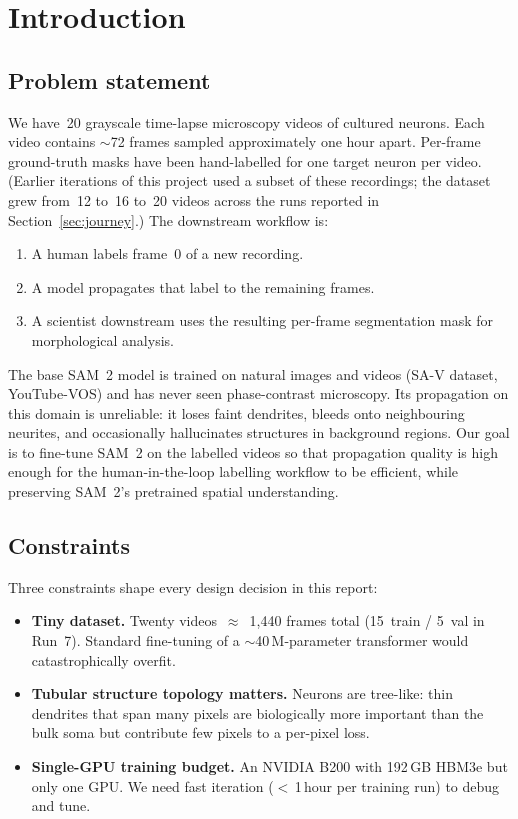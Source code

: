 \documentclass[11pt,a4paper]{article}
\begin{document}
\section{Introduction}

\subsection{Problem statement}

We have~20 grayscale time-lapse microscopy videos of cultured neurons.
Each video contains $\sim$72 frames sampled approximately one hour
apart. Per-frame ground-truth masks have been hand-labelled for one
target neuron per video. (Earlier iterations of this project used
a subset of these recordings; the dataset grew from~12 to~16 to~20
videos across the runs reported in Section~\ref{sec:journey}.) The downstream workflow is:
\begin{enumerate}[noitemsep,topsep=3pt]
    \item A human labels frame~0 of a new recording.
    \item A model propagates that label to the remaining frames.
    \item A scientist downstream uses the resulting per-frame
          segmentation mask for morphological analysis.
\end{enumerate}

The base SAM~2 model is trained on natural images and videos
(SA-V dataset, YouTube-VOS) and has never seen phase-contrast
microscopy. Its propagation on this domain is unreliable: it loses
faint dendrites, bleeds onto neighbouring neurites, and occasionally
hallucinates structures in background regions. Our goal is to
fine-tune SAM~2 on the labelled videos so that propagation quality
is high enough for the human-in-the-loop labelling workflow to be
efficient, while preserving SAM~2's pretrained spatial understanding.

\subsection{Constraints}

Three constraints shape every design decision in this report:
\begin{itemize}[noitemsep,topsep=3pt]
    \item \textbf{Tiny dataset.} Twenty videos~$\approx$~1{,}440 frames
          total (15~train / 5~val in Run~7). Standard fine-tuning of
          a $\sim$40\,M-parameter transformer would catastrophically
          overfit.
    \item \textbf{Tubular structure topology matters.} Neurons are
          tree-like: thin dendrites that span many pixels are
          biologically more important than the bulk soma but
          contribute few pixels to a per-pixel loss.
    \item \textbf{Single-GPU training budget.} An NVIDIA B200 with
          192\,GB HBM3e but only one GPU. We need fast iteration
          ($<$\,1\,hour per training run) to debug and tune.
\end{itemize}
\end{document}
